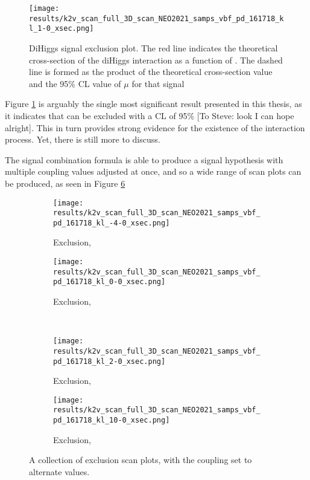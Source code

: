     \begin{figure}
        \texttt{[image: results/k2v\_scan\_full\_3D\_scan\_NEO2021\_samps\_vbf\_pd\_161718\_kl\_1-0\_xsec.png]}
        \caption{DiHiggs signal \kvv exclusion plot.
            The red line indicates the theoretical cross-section of the diHiggs interaction as a function of \kvv.
            The dashed line is formed as the product of the theoretical cross-section value
                and the 95\% CL value of $\mu$ for that \kvv signal}
        \label{fig:kvv_SM_scan}
    \end{figure}

    Figure \ref{fig:kvv_SM_scan} is arguably the single most significant result presented in this thesis,
        as it indicates that  can be excluded with a CL of 95\% [To Steve: look I can hope alright].
    This in turn provides strong evidence for the existence of the \HHVV interaction process.
    Yet, there is still more to discuss.

    The signal combination formula is able to produce a signal hypothesis with multiple coupling values adjusted at once,
        and so a wide range of \kvv scan plots can be produced, as seen in Figure \ref{fig:kvv_multi_kl}

    \begin{figure}
        \centering
        \begin{subfigure}{0.48\textwidth} 
            \texttt{[image: results/k2v\_scan\_full\_3D\_scan\_NEO2021\_samps\_vbf\_pd\_161718\_kl\_-4-0\_xsec.png]}
            \caption{\kvv Exclusion, }
            \label{fig:kvv_scan_kl0}
        \end{subfigure}
        \begin{subfigure}{0.48\textwidth} 
            \texttt{[image: results/k2v\_scan\_full\_3D\_scan\_NEO2021\_samps\_vbf\_pd\_161718\_kl\_0-0\_xsec.png]}
            \caption{\kvv Exclusion, }
            \label{fig:kvv_scan_kl1}
        \end{subfigure} \\
        \begin{subfigure}{0.48\textwidth}
            \texttt{[image: results/k2v\_scan\_full\_3D\_scan\_NEO2021\_samps\_vbf\_pd\_161718\_kl\_2-0\_xsec.png]}
            \caption{\kvv Exclusion, }
            \label{fig:kvv_scan_kl2}
        \end{subfigure}
        \begin{subfigure}{0.48\textwidth}
            \texttt{[image: results/k2v\_scan\_full\_3D\_scan\_NEO2021\_samps\_vbf\_pd\_161718\_kl\_10-0\_xsec.png]}
            \caption{\kvv Exclusion, }
            \label{fig:kvv_scan_kl10}
        \end{subfigure}
        \caption{
            A collection of \kvv exclusion scan plots, with the \kl coupling set to alternate values.
        }\label{fig:kvv_multi_kl}
    \end{figure}


